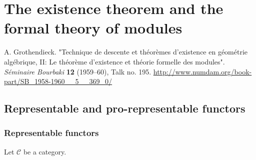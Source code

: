\part{The existence theorem and the formal theory of modules}\label{fga3.ii}\thispagestyle{fancy}\begin{original}{}\label{fga3.ii-original-citation}\skipsinglepar\par{}A. Grothendieck.
    "Technique de descente et théorèmes d'existence en géométrie algébrique, II: Le théorème d'existence et théorie formelle des modules".
    \emph{Séminaire Bourbaki} \textbf{12} (1959–60), Talk no. 195.
    \url{http://www.numdam.org/book-part/SB_1958-1960__5__369_0/}\end{original}\chapter{Representable and pro-representable functors}\thispagestyle{fancy}\label{fga3.ii-a}\section{Representable functors}\label{fga3.ii-a.1}\par{}Let \(\mathcal {C}\) be a category.
  
